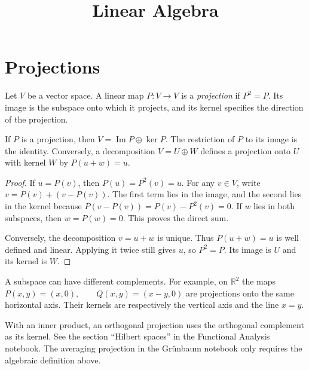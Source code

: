



\title{Linear Algebra}
\maketitle

\label{section-phantom}

\tableofcontents

\section{Projections}
\label{section-projections}

\begin{definition}
\label{definition-projection}
Let $V$ be a vector space. A linear map
$P:V\to V$ is a {\it projection} if
$
P^2=P.
$
Its image is the subspace onto which
it projects, and its kernel specifies
the direction of the projection.
\end{definition}

\begin{lemma}
\label{lemma-projection-decomposition}
If $P$ is a projection, then
$
V=\operatorname{Im}P\oplus\ker P.
$
The restriction of $P$ to its image is
the identity. Conversely, a decomposition
$V=U\oplus W$ defines a projection onto
$U$ with kernel $W$ by $P(u+w)=u$.
\end{lemma}

\begin{proof}
If $u=P(v)$, then $P(u)=P^2(v)=u$.
For any $v\in V$, write
$
v=P(v)+(v-P(v)).
$
The first term lies in the image, and
the second lies in the kernel because
$
P(v-P(v))=P(v)-P^2(v)=0.
$
If $w$ lies in both subspaces, then
$w=P(w)=0$. This proves the direct sum.

Conversely, the decomposition $v=u+w$
is unique. Thus $P(u+w)=u$ is well
defined and linear. Applying it twice
still gives $u$, so $P^2=P$.
Its image is $U$ and its kernel is $W$.
\end{proof}

\begin{remark}
\label{remark-projection-choice}
A subspace can have different complements.
For example, on $\mathbb{R}^2$ the maps
$
P(x,y)=(x,0),\qquad Q(x,y)=(x-y,0)
$
are projections onto the same horizontal
axis. Their kernels are respectively
the vertical axis and the line $x=y$.

With an inner product, an orthogonal
projection uses the orthogonal complement
as its kernel. See
the section ``Hilbert spaces'' in the
Functional Analysis notebook.
The averaging projection in the
Gr\"unbaum notebook only requires the
algebraic definition above.
\end{remark}

